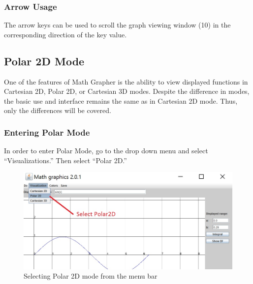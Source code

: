 \documentclass{article}[12 pt]
\begin{document}
			\subsubsection{Arrow Usage}
			The arrow keys can be used to scroll the graph viewing window (10) in the corresponding direction of the key value. 
			
	\subsection{Polar 2D Mode}
		One of the features of Math Grapher is the ability to view displayed functions in Cartesian 2D, Polar 2D, or Cartesian 3D modes. Despite the difference in modes, the basic use and interface remains the same as in Cartesian 2D mode. Thus, only the differences will be covered.

		\subsubsection{Entering Polar Mode}
			In order to enter Polar Mode, go to the drop down menu and select ``Visualizations.'' Then select ``Polar 2D.'' 
				\begin{figure}[h!]
					\centering
					\includegraphics[scale = .75]{polar}
					\caption{Selecting Polar 2D mode from the menu bar}
				\end{figure}
				
\end{document}
